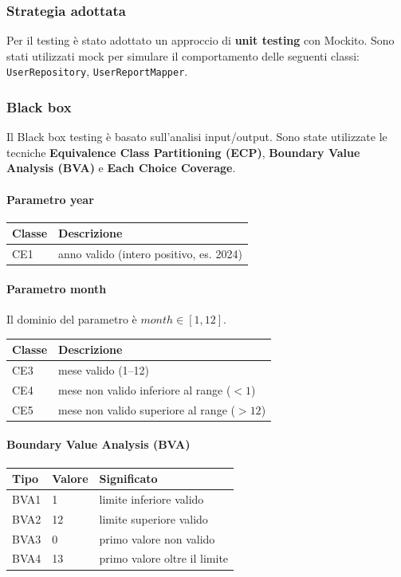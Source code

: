 \documentclass[a4paper,12pt]{article}
\begin{document}
\subsubsection{Strategia adottata}
Per il testing è stato adottato un approccio di \textbf{unit testing} con Mockito. Sono stati utilizzati mock per simulare il comportamento delle seguenti classi: \texttt{UserRepository}, \texttt{UserReportMapper}.

\subsubsection{Black box}
Il Black box testing è basato sull'analisi input/output. Sono state utilizzate le tecniche \textbf{Equivalence Class Partitioning (ECP)}, \textbf{Boundary Value Analysis (BVA)} e \textbf{Each Choice Coverage}.

\paragraph{Parametro year}
\begin{longtable}{|p{1.8cm}|p{11.5cm}|}
\hline
\textbf{Classe} & \textbf{Descrizione} \\ \hline
CE1 & anno valido (intero positivo, es. 2024) \\ \hline
\end{longtable}

\paragraph{Parametro month}
Il dominio del parametro è $month \in [1, 12]$.

\begin{longtable}{|p{1.8cm}|p{11.5cm}|}
\hline
\textbf{Classe} & \textbf{Descrizione} \\ \hline
CE3 & mese valido (1--12) \\ \hline
CE4 & mese non valido inferiore al range ($<1$) \\ \hline
CE5 & mese non valido superiore al range ($>12$) \\ \hline
\end{longtable}

\paragraph{Boundary Value Analysis (BVA)}
\begin{longtable}{|p{1.8cm}|p{2.5cm}|p{9cm}|}
\hline
\textbf{Tipo} & \textbf{Valore} & \textbf{Significato} \\ \hline
BVA1 & 1 & limite inferiore valido \\ \hline
BVA2 & 12 & limite superiore valido \\ \hline
BVA3 & 0 & primo valore non valido \\ \hline
BVA4 & 13 & primo valore oltre il limite \\ \hline
\end{longtable}
\end{document}
